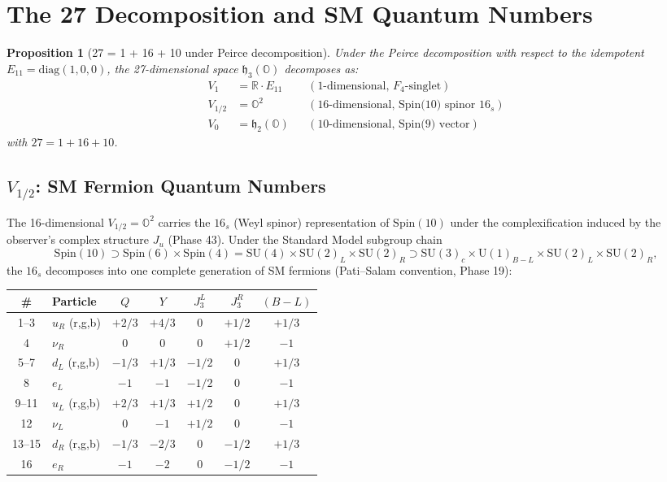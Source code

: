 \documentclass[11pt]{article}
\newtheorem{proposition}[theorem]{Proposition}
\begin{document}
\section{The 27 Decomposition and SM Quantum Numbers}

\begin{proposition}[27 = 1 + 16 + 10 under Peirce decomposition]\label{prop:27}
Under the Peirce decomposition with respect to the idempotent $E_{11} = \mathrm{diag}(1,0,0)$,
the 27-dimensional space $\mathfrak{h}_3(\mathbb{O})$ decomposes as:
\begin{align}
V_1 &= \mathbb{R} \cdot E_{11} & &(\text{1-dimensional, $F_4$-singlet}) \\
V_{1/2} &= \mathbb{O}^2 & &(\text{16-dimensional, Spin(10) spinor $16_s$}) \\
V_0 &= \mathfrak{h}_2(\mathbb{O}) & &(\text{10-dimensional, Spin(9) vector})
\end{align}
with $27 = 1 + 16 + 10$.
\end{proposition}

\subsection{$V_{1/2}$: SM Fermion Quantum Numbers}

The 16-dimensional $V_{1/2} = \mathbb{O}^2$ carries the $16_s$ (Weyl spinor)
representation of $\mathrm{Spin}(10)$ under the complexification induced by the
observer's complex structure $J_u$ (Phase 43). Under the Standard Model
subgroup chain
\[
\mathrm{Spin}(10) \supset \mathrm{Spin}(6) \times \mathrm{Spin}(4)
= \mathrm{SU}(4) \times \mathrm{SU}(2)_L \times \mathrm{SU}(2)_R
\supset \mathrm{SU}(3)_c \times \mathrm{U}(1)_{B-L} \times \mathrm{SU}(2)_L \times \mathrm{SU}(2)_R,
\]
the $16_s$ decomposes into one complete generation of SM fermions
(Pati--Salam convention, Phase 19):

\begin{center}
\begin{tabular}{c|l|c|c|c|c|c}
\# & Particle & $Q$ & $Y$ & $J_3^L$ & $J_3^R$ & $(B{-}L)$ \\
\hline
1--3 & $u_R$ (r,g,b) & $+2/3$ & $+4/3$ & $0$ & $+1/2$ & $+1/3$ \\
4 & $\nu_R$ & $0$ & $0$ & $0$ & $+1/2$ & $-1$ \\
5--7 & $d_L$ (r,g,b) & $-1/3$ & $+1/3$ & $-1/2$ & $0$ & $+1/3$ \\
8 & $e_L$ & $-1$ & $-1$ & $-1/2$ & $0$ & $-1$ \\
9--11 & $u_L$ (r,g,b) & $+2/3$ & $+1/3$ & $+1/2$ & $0$ & $+1/3$ \\
12 & $\nu_L$ & $0$ & $-1$ & $+1/2$ & $0$ & $-1$ \\
13--15 & $d_R$ (r,g,b) & $-1/3$ & $-2/3$ & $0$ & $-1/2$ & $+1/3$ \\
16 & $e_R$ & $-1$ & $-2$ & $0$ & $-1/2$ & $-1$
\end{tabular}
\end{center}
\end{document}
